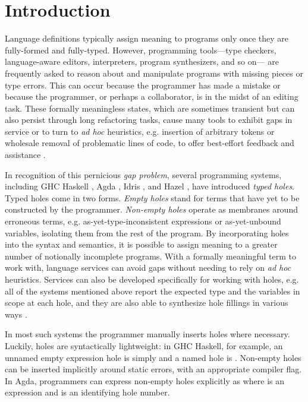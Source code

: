 \section{Introduction}
\label{sec:intro}

Language definitions typically assign meaning to programs only once they are fully-formed and fully-typed. 
However, programming tools---type checkers, language-aware editors, interpreters, program synthesizers, and so on---%
are frequently asked to reason about and manipulate programs with missing pieces or type errors.
This can occur because the programmer has made a mistake or because the programmer, or perhaps a collaborator, is in the midst of an editing task.
These formally meaningless states, which are sometimes transient but can also persist through long refactoring tasks, cause many tools to exhibit gaps in service or to turn to  
\emph{ad hoc} heuristics, e.g. insertion of arbitrary tokens or wholesale removal of problematic lines of code, to offer best-effort feedback and assistance \cite{HazelnutSNAPL, DBLP:conf/oopsla/KatsJNV09}.

In recognition of this pernicious \emph{gap problem}, several programming systems, 
including GHC Haskell \cite{GHCHoles}, Agda \cite{norell:thesis}, Idris \cite{brady2013idris}, and Hazel \cite{DBLP:conf/popl/OmarVHAH17}, have introduced \emph{typed holes}. Typed holes come in two forms. \emph{Empty holes} 
stand for terms that have yet to be constructed by the programmer. 
\emph{Non-empty holes} 
operate as membranes around erroneous terms, e.g. as-yet-type-inconsistent
expressions or as-yet-unbound variables, 
isolating them from the rest of the program.
By incorporating holes into the syntax and semantics, 
it is possible to assign meaning to a greater number of notionally incomplete programs.
With a formally meaningful term to work with, language services can avoid gaps without needing to rely on \emph{ad hoc} heuristics.
Services can also be developed specifically for working with holes, e.g. all of the systems mentioned above report  
the expected type and the variables in scope at each hole, and they are also able to synthesize hole fillings in various ways \cite{DBLP:conf/haskell/Gissurarson18,DBLP:journals/pacmpl/LubinCOC20}.

In most such systems the programmer manually inserts holes where necessary.
Luckily, holes are syntactically lightweight: in GHC Haskell, for example, an unnamed empty expression
hole is simply \li{_} and a named hole is . 
Non-empty holes can be inserted implicitly around static errors, with an appropriate compiler flag. 
In Agda, programmers can express  
non-empty holes explicitly as  where  is an expression and  is an identifying hole number.

